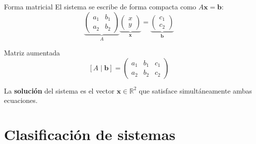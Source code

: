 \documentclass[11pt, aspectratio=169]{beamer}
\newcommand{\R}{\mathbb{R}}
\begin{document}
	\begin{frame}{Forma matricial}
		El sistema se escribe de forma compacta como $A\mathbf{x} = \mathbf{b}$:
		\[
		\underbrace{\begin{pmatrix} a_1 & b_1 \\ a_2 & b_2 \end{pmatrix}}_{A}
		\underbrace{\begin{pmatrix} x \\ y \end{pmatrix}}_{\mathbf{x}}
		=
		\underbrace{\begin{pmatrix} c_1 \\ c_2 \end{pmatrix}}_{\mathbf{b}}
		\]
		
		\vspace{0.5em}
		\begin{block}{Matriz aumentada}
			\[
			[A \mid \mathbf{b}] =
			\left(\begin{array}{cc|c}
				a_1 & b_1 & c_1 \\
				a_2 & b_2 & c_2
			\end{array}\right)
			\]
		\end{block}
		
		\vspace{0.3em}
		La \textbf{solución} del sistema es el vector $\mathbf{x} \in \R^2$ que satisface
		simultáneamente ambas ecuaciones.
	\end{frame}
	
	\section{Clasificación de sistemas}
	
\end{document}
